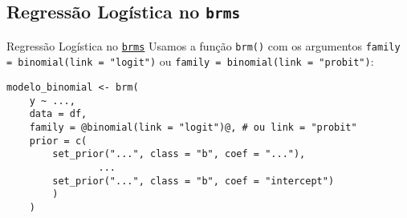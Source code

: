 \subsection{Regressão Logística no \texttt{brms}}
\begin{frame}[fragile]{Regressão Logística no \href{https://paul-buerkner.github.io/brms/}{\texttt{brms}}}
    Usamos a função \texttt{brm()} com os argumentos \texttt{family = binomial(link = "logit")} ou
    \texttt{family = binomial(link = "probit")}:
    \vfill
    \begin{lstlisting}[basicstyle=\small]
    modelo_binomial <- brm(
    y ~ ...,
    data = df,
    family = @binomial(link = "logit")@, # ou link = "probit"
    prior = c(
        set_prior("...", class = "b", coef = "..."),
                ...
        set_prior("...", class = "b", coef = "intercept")
        )
    )
    \end{lstlisting}
\end{frame}
